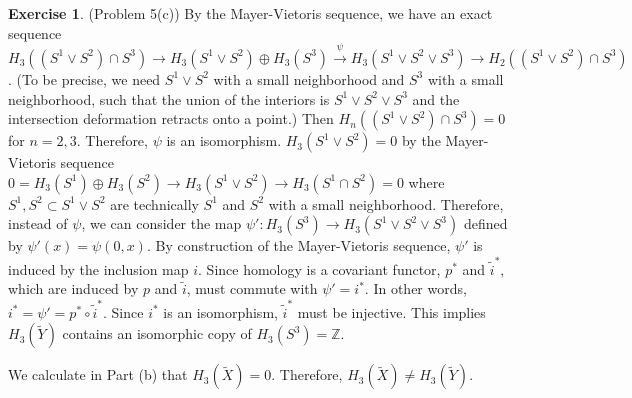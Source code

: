 \documentclass[12pt, psamsfonts]{amsart}
\theoremstyle{definition}
\newtheorem*{exer}{Exercise}
\theoremstyle{remark}
\numberwithin{equation}{section}
\begin{document}
\begin{exer}{(Problem 5(c))}
  By the Mayer-Vietoris sequence, we have an exact sequence $H_3((S^1 \vee S^2) \cap S^3) \rightarrow H_3(S^1 \vee S^2) \oplus H_3(S^3) \xrightarrow{\psi} H_3(S^1 \vee S^2 \vee S^3) \rightarrow H_2((S^1 \vee S^2) \cap S^3)$.
  (To be precise, we need $S^1 \vee S^2$ with a small neighborhood and $S^3$ with a small neighborhood, such that the union of the interiors is $S^1 \vee S^2 \vee S^3$ and the intersection deformation retracts onto a point.)
  Then $H_n((S^1 \vee S^2) \cap S^3) = 0$ for $n = 2, 3$.
  Therefore, $\psi$ is an isomorphism.
  $H_3(S^1 \vee S^2) = 0$ by the Mayer-Vietoris sequence $0 = H_3(S^1) \oplus H_3(S^2) \rightarrow H_3(S^1 \vee S^2) \rightarrow H_3(S^1 \cap S^2) = 0$ where $S^1, S^2 \subset S^1 \vee S^2$ are technically $S^1$ and $S^2$ with a small neighborhood.
  Therefore, instead of $\psi$, we can consider the map $\psi': H_3(S^3) \rightarrow H_3(S^1 \vee S^2 \vee S^3)$ defined by $\psi'(x) = \psi(0, x)$.
  By construction of the Mayer-Vietoris sequence, $\psi'$ is induced by the inclusion map $i$.
  Since homology is a covariant functor, $p^{*}$ and $\tilde{i}^{*}$, which are induced by $p$ and $\tilde{i}$, must commute with $\psi' = i^{*}$.
  In other words, $i^{*} = \psi' = p^{*} \circ \tilde{i}^{*}$.
  Since $i^{*}$ is an isomorphism, $\tilde{i}^{*}$ must be injective.
  This implies $H_3(\tilde{Y})$ contains an isomorphic copy of $H_3(S^3) = \mathbb{Z}$.

  We calculate in Part (b) that $H_3(\tilde{X}) = 0$.
  Therefore, $H_3(\tilde{X}) \ne H_3(\tilde{Y})$.
\end{exer}
\end{document}
